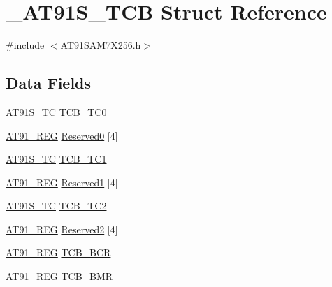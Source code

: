 \hypertarget{struct__AT91S__TCB}{\section{\-\_\-\-A\-T91\-S\-\_\-\-T\-C\-B Struct Reference}
\label{struct__AT91S__TCB}
}


{\ttfamily \#include $<$A\-T91\-S\-A\-M7\-X256.\-h$>$}

\subsection*{Data Fields}
\begin{DoxyCompactItemize}
\item 
\hyperlink{GCC_2ARM7__AT91SAM7S_2AT91SAM7X256_8h_a44892794b398f4ebc5ac9b02e9469d4b}{A\-T91\-S\-\_\-\-T\-C} \hyperlink{struct__AT91S__TCB_a40f09d0bd80e0c6cda2435c363e9adf4}{T\-C\-B\-\_\-\-T\-C0}
\item 
\hyperlink{GCC_2ARM7__AT91SAM7S_2AT91SAM7X256_8h_a712ad5a1ac1bd02f3e95a7526c283ce1}{A\-T91\-\_\-\-R\-E\-G} \hyperlink{struct__AT91S__TCB_afdc45358f1b9877848d86c2a961b8fcd}{Reserved0} \mbox{[}4\mbox{]}
\item 
\hyperlink{GCC_2ARM7__AT91SAM7S_2AT91SAM7X256_8h_a44892794b398f4ebc5ac9b02e9469d4b}{A\-T91\-S\-\_\-\-T\-C} \hyperlink{struct__AT91S__TCB_a81f675759b06d83bf2be86add42a53b2}{T\-C\-B\-\_\-\-T\-C1}
\item 
\hyperlink{GCC_2ARM7__AT91SAM7S_2AT91SAM7X256_8h_a712ad5a1ac1bd02f3e95a7526c283ce1}{A\-T91\-\_\-\-R\-E\-G} \hyperlink{struct__AT91S__TCB_a3cc49e27722e8de9d6d5fadb6445c391}{Reserved1} \mbox{[}4\mbox{]}
\item 
\hyperlink{GCC_2ARM7__AT91SAM7S_2AT91SAM7X256_8h_a44892794b398f4ebc5ac9b02e9469d4b}{A\-T91\-S\-\_\-\-T\-C} \hyperlink{struct__AT91S__TCB_af0a41cf819ea1e66f830d075116177db}{T\-C\-B\-\_\-\-T\-C2}
\item 
\hyperlink{GCC_2ARM7__AT91SAM7S_2AT91SAM7X256_8h_a712ad5a1ac1bd02f3e95a7526c283ce1}{A\-T91\-\_\-\-R\-E\-G} \hyperlink{struct__AT91S__TCB_aa7bc844b1136c77f0e771bb2d9069ab9}{Reserved2} \mbox{[}4\mbox{]}
\item 
\hyperlink{GCC_2ARM7__AT91SAM7S_2AT91SAM7X256_8h_a712ad5a1ac1bd02f3e95a7526c283ce1}{A\-T91\-\_\-\-R\-E\-G} \hyperlink{struct__AT91S__TCB_a835cbeb765a56023288cb97dc1fe0b9b}{T\-C\-B\-\_\-\-B\-C\-R}
\item 
\hyperlink{GCC_2ARM7__AT91SAM7S_2AT91SAM7X256_8h_a712ad5a1ac1bd02f3e95a7526c283ce1}{A\-T91\-\_\-\-R\-E\-G} \hyperlink{struct__AT91S__TCB_ac235985e8fa3bbf38093a7153c621d66}{T\-C\-B\-\_\-\-B\-M\-R}
\end{DoxyCompactItemize}


